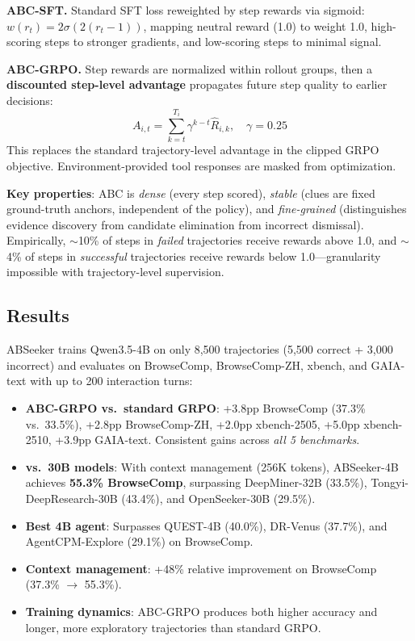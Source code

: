 \documentclass[11pt,a4paper]{article}
\begin{document}
\textbf{ABC-SFT.} Standard SFT loss reweighted by step rewards via sigmoid: $w(r_t) = 2\sigma(2(r_t - 1))$, mapping neutral reward (1.0) to weight 1.0, high-scoring steps to stronger gradients, and low-scoring steps to minimal signal.

\textbf{ABC-GRPO.} Step rewards are normalized within rollout groups, then a \textbf{discounted step-level advantage} propagates future step quality to earlier decisions:
\begin{equation}
    A_{i,t} = \sum_{k=t}^{T_i} \gamma^{k-t} \hat{R}_{i,k}, \quad \gamma = 0.25
\end{equation}
This replaces the standard trajectory-level advantage in the clipped GRPO objective. Environment-provided tool responses are masked from optimization.

\textbf{Key properties}: ABC is \emph{dense} (every step scored), \emph{stable} (clues are fixed ground-truth anchors, independent of the policy), and \emph{fine-grained} (distinguishes evidence discovery from candidate elimination from incorrect dismissal). Empirically, $\sim$10\% of steps in \emph{failed} trajectories receive rewards above 1.0, and $\sim$4\% of steps in \emph{successful} trajectories receive rewards below 1.0---granularity impossible with trajectory-level supervision.

\subsection{Results}
ABSeeker trains Qwen3.5-4B on only 8,500 trajectories (5,500 correct + 3,000 incorrect) and evaluates on BrowseComp, BrowseComp-ZH, xbench, and GAIA-text with up to 200 interaction turns:
\begin{itemize}
    \item \textbf{ABC-GRPO vs.\ standard GRPO}: +3.8pp BrowseComp (37.3\% vs.\ 33.5\%), +2.8pp BrowseComp-ZH, +2.0pp xbench-2505, +5.0pp xbench-2510, +3.9pp GAIA-text. Consistent gains across \emph{all 5 benchmarks}.
    \item \textbf{vs.\ 30B models}: With context management (256K tokens), ABSeeker-4B achieves \textbf{55.3\% BrowseComp}, surpassing DeepMiner-32B (33.5\%), Tongyi-DeepResearch-30B (43.4\%), and OpenSeeker-30B (29.5\%).
    \item \textbf{Best 4B agent}: Surpasses QUEST-4B (40.0\%), DR-Venus (37.7\%), and AgentCPM-Explore (29.1\%) on BrowseComp.
    \item \textbf{Context management}: +48\% relative improvement on BrowseComp (37.3\% $\to$ 55.3\%).
    \item \textbf{Training dynamics}: ABC-GRPO produces both higher accuracy and longer, more exploratory trajectories than standard GRPO.
\end{itemize}
\end{document}
